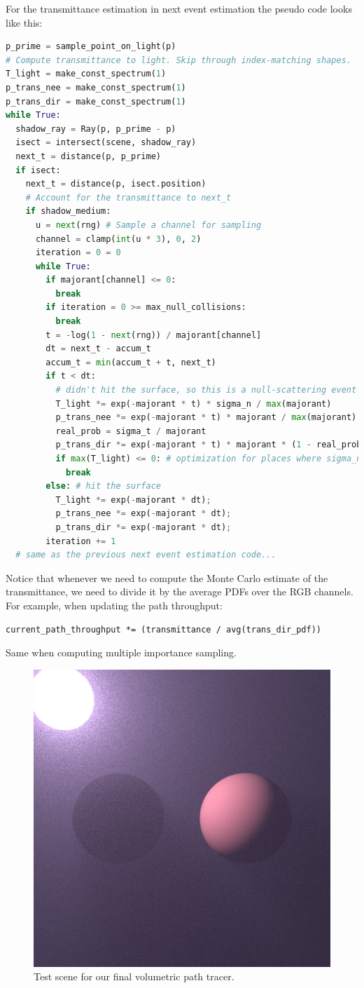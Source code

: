 For the transmittance estimation in next event estimation the pseudo code looks like this:
\begin{lstlisting}[language=python]
p_prime = sample_point_on_light(p)
# Compute transmittance to light. Skip through index-matching shapes.
T_light = make_const_spectrum(1)
p_trans_nee = make_const_spectrum(1)
p_trans_dir = make_const_spectrum(1)
while True:
  shadow_ray = Ray(p, p_prime - p)
  isect = intersect(scene, shadow_ray)
  next_t = distance(p, p_prime)
  if isect:
    next_t = distance(p, isect.position)
    # Account for the transmittance to next_t
    if shadow_medium:
      u = next(rng) # Sample a channel for sampling
      channel = clamp(int(u * 3), 0, 2)
      iteration = 0 = 0
      while True:
        if majorant[channel] <= 0:
          break
        if iteration = 0 >= max_null_collisions:
          break
        t = -log(1 - next(rng)) / majorant[channel]
        dt = next_t - accum_t
        accum_t = min(accum_t + t, next_t)
        if t < dt:
          # didn't hit the surface, so this is a null-scattering event
          T_light *= exp(-majorant * t) * sigma_n / max(majorant)
          p_trans_nee *= exp(-majorant * t) * majorant / max(majorant)
          real_prob = sigma_t / majorant
          p_trans_dir *= exp(-majorant * t) * majorant * (1 - real_prob) / max(majorant)
          if max(T_light) <= 0: # optimization for places where sigma_n = 0
            break
        else: # hit the surface
          T_light *= exp(-majorant * dt);
          p_trans_nee *= exp(-majorant * dt);
          p_trans_dir *= exp(-majorant * dt);
        iteration += 1
  # same as the previous next event estimation code...
\end{lstlisting}

Notice that whenever we need to compute the Monte Carlo estimate of the transmittance, we need to divide it by the
average PDFs over the RGB channels. For example, when updating the path throughput:
\begin{lstlisting}
current_path_throughput *= (transmittance / avg(trans_dir_pdf))
\end{lstlisting}
Same when computing multiple importance sampling.

\begin{figure}
\centering
\includegraphics[width=0.48\linewidth]{imgs/volpath_6.png}
\caption{Test scene for our final volumetric path tracer.}
\label{fig:volpath6}
\end{figure}

